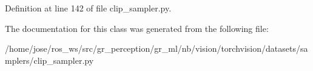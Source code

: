 Definition at line 142 of file clip\+\_\+sampler.\+py.



The documentation for this class was generated from the following file\+:\begin{DoxyCompactItemize}
\item 
/home/jose/ros\+\_\+ws/src/gr\+\_\+perception/gr\+\_\+ml/nb/vision/torchvision/datasets/samplers/clip\+\_\+sampler.\+py\end{DoxyCompactItemize}
